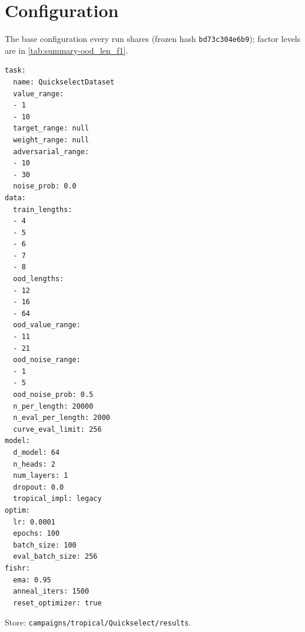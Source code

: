 \documentclass[10pt]{article}
\begin{document}
\section{Configuration}
The base configuration every run shares (frozen hash \texttt{bd73c304e6b9}); factor levels are in \autoref{tab:summary-ood_len_f1}.
{\footnotesize
\begin{verbatim}
task:
  name: QuickselectDataset
  value_range:
  - 1
  - 10
  target_range: null
  weight_range: null
  adversarial_range:
  - 10
  - 30
  noise_prob: 0.0
data:
  train_lengths:
  - 4
  - 5
  - 6
  - 7
  - 8
  ood_lengths:
  - 12
  - 16
  - 64
  ood_value_range:
  - 11
  - 21
  ood_noise_range:
  - 1
  - 5
  ood_noise_prob: 0.5
  n_per_length: 20000
  n_eval_per_length: 2000
  curve_eval_limit: 256
model:
  d_model: 64
  n_heads: 2
  num_layers: 1
  dropout: 0.0
  tropical_impl: legacy
optim:
  lr: 0.0001
  epochs: 100
  batch_size: 100
  eval_batch_size: 256
fishr:
  ema: 0.95
  anneal_iters: 1500
  reset_optimizer: true
\end{verbatim}
}
Store: \texttt{campaigns/tropical/Quickselect/results}.
\end{document}
